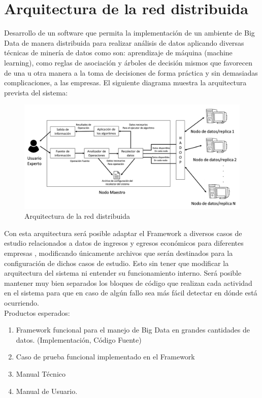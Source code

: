 \section{Arquitectura de la red distribuida}
Desarrollo de un software que permita la implementación de un ambiente de Big Data de manera distribuida para realizar análisis
de datos aplicando diversas técnicas de minería de datos como son: aprendizaje de máquina (machine learning), como reglas de
asociación y árboles de decisión mismos que favorecen de una u otra manera a la toma de decisiones de forma práctica y sin
demasiadas complicaciones, a las empresas. El siguiente diagrama muestra la arquitectura prevista del sistema:
\\
\begin{figure}[!htbp]
	\hypertarget{fig:cap1}{\hspace{1pt}}
	\begin{center}
		\includegraphics[height=0.3\textheight]{capitulo1/images/im1.png}
		\caption{Arquitectura de la red distribuida}
		\label{fig:cap1}
	\end{center}
\end{figure}
Con esta arquitectura será posible adaptar el Framework a diversos casos de estudio relacionados a datos de ingresos y egresos
económicos para diferentes empresas , modificando únicamente archivos que serán destinados para la configuración de dichos
casos de estudio. Esto sin tener que modificar la arquitectura del sistema ni entender su funcionamiento interno. Será posible
mantener muy bien separados los bloques de código que realizan cada actividad en el sistema para que en caso de algún fallo sea
más fácil detectar en dónde está ocurriendo.
\\
Productos esperados:
\\
\begin{enumerate}
	\item Framework funcional para el manejo de Big Data en grandes cantidades de datos. (Implementación, Código Fuente)
	\item Caso de prueba funcional implementado en el Framework
	\item Manual Técnico
	\item Manual de Usuario.
\end{enumerate}
